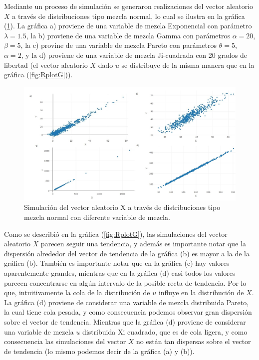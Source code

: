 Mediante un proceso de simulación se generaron realizaciones del vector aleatorio $X$ a través de distribuciones tipo mezcla normal, lo cual se ilustra en la gráfica (\ref{fig:abcd}). La gráfica a) proviene de una variable de mezcla Exponencial con parámetro $\lambda=1.5$, la b) proviene de una variable de mezcla Gamma con parámetros $\alpha=20$, $\beta=5$, la c) provine de una variable de mezcla Pareto con parámetros $\theta=5$, $\alpha=2$, y la d) proviene de una variable de mezcla Ji-cuadrada con 20 grados de libertad (el vector aleatorio $X$ dado $u$ se distribuye de la misma manera que en la gráfica (\ref{fig:RplotG})).

\begin{figure}[h]
	\centering
	\includegraphics[width=1\linewidth]{Figuras/expo}
	\caption{Simulación del vector aleatorio X a través de distribuciones tipo mezcla normal con diferente variable de mezcla.}
	\label{fig:abcd}
\end{figure}
Como se describió en la gráfica (\ref{fig:RplotG}), las simulaciones del vector aleatorio $X$ parecen seguir una tendencia, y además es importante notar que la dispersión alrededor del vector de tendencia de la gráfica (b) es mayor a la de la gráfica (b). También es importante notar que en la gráfica (c) hay valores aparentemente grandes, mientras que en la gráfica (d) casi todos los valores parecen concentrarse en algún intervalo de la posible recta de tendencia.
Por lo que, intuitivamente la cola de la distribución de $u$ influye en la distribución de $X$. La gráfica (d) proviene de considerar una variable de mezcla distribuida Pareto, la cual tiene cola pesada, y como consecuencia podemos observar gran dispersión sobre el vector de tendencia. Mientras que la gráfica (d) proviene de considerar una variable de mezcla $u$ distribuida Xi cuadrado, que es de cola ligera, y como consecuencia las simulaciones del vector $X$ no están tan dispersas sobre el vector de tendencia (lo mismo podemos decir de la gráfica (a) y (b)).


